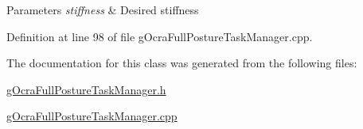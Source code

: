 \begin{DoxyParams}{Parameters}
{\em stiffness} & Desired stiffness \\
\hline
\end{DoxyParams}


Definition at line 98 of file g\+Ocra\+Full\+Posture\+Task\+Manager.\+cpp.



The documentation for this class was generated from the following files\+:\begin{DoxyCompactItemize}
\item 
\hyperlink{gOcraFullPostureTaskManager_8h}{g\+Ocra\+Full\+Posture\+Task\+Manager.\+h}\item 
\hyperlink{gOcraFullPostureTaskManager_8cpp}{g\+Ocra\+Full\+Posture\+Task\+Manager.\+cpp}\end{DoxyCompactItemize}
